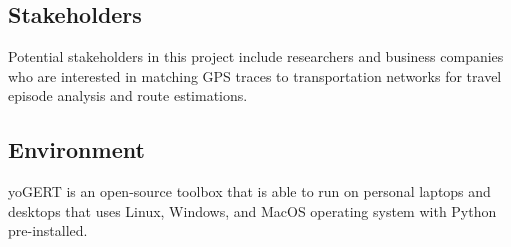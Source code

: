 \documentclass{article}
\begin{document}
\subsection{Stakeholders}
Potential stakeholders in this project include researchers and business companies who are interested in matching GPS traces to 
transportation networks for travel episode analysis and route estimations.

\subsection{Environment}
yoGERT is an open-source toolbox that is able to run on personal laptops and desktops that uses Linux, Windows, and MacOS operating system 
with Python pre-installed.


\newpage
\end{document}

